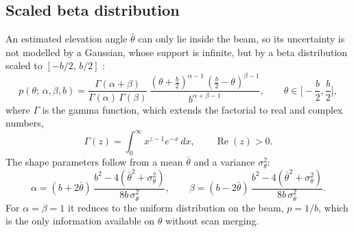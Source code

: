 \subsection{Scaled beta distribution}    %
\label{sec:def_beta}                     %

An estimated elevation angle $\hat{\theta}$ can only lie inside the beam, so its uncertainty is not
modelled by a Gaussian, whose support is infinite, but by a beta distribution scaled to
$[-b/2,\, b/2]$ \citep{johnson1994continuous, breux2020elevation}:
\begin{equation}                         %
  p(\theta;\, \alpha, \beta, b) = \frac{\Gamma(\alpha+\beta)}{\Gamma(\alpha)\,\Gamma(\beta)}\,
  \frac{(\theta + \frac{b}{2})^{\alpha-1}\,(\frac{b}{2} - \theta)^{\beta-1}}{b^{\alpha+\beta-1}},
  \qquad \theta \in \Big[-\frac{b}{2}, \frac{b}{2}\Big],
  \label{eq:def_beta}
\end{equation}
where $\Gamma$ is the gamma function, which extends the factorial to real and complex numbers,
\begin{equation}                         %
  \Gamma(z) = \int_0^{\infty} x^{z-1} e^{-x}\, dx, \qquad \operatorname{Re}(z) > 0.
  \label{eq:def_gamma}
\end{equation}
The shape parameters follow from a mean $\bar{\theta}$ and a variance $\sigma_\theta^2$:
\begin{equation}                         %
  \alpha = (b + 2\bar{\theta})\,\frac{b^2 - 4(\bar{\theta}^2 + \sigma_\theta^2)}{8b\,\sigma_\theta^2},
  \qquad
  \beta  = (b - 2\bar{\theta})\,\frac{b^2 - 4(\bar{\theta}^2 + \sigma_\theta^2)}{8b\,\sigma_\theta^2}.
  \label{eq:def_beta_params}
\end{equation}
For $\alpha = \beta = 1$ it reduces to the uniform distribution on the beam, $p = 1/b$, which is the
only information available on $\theta$ without scan merging.


